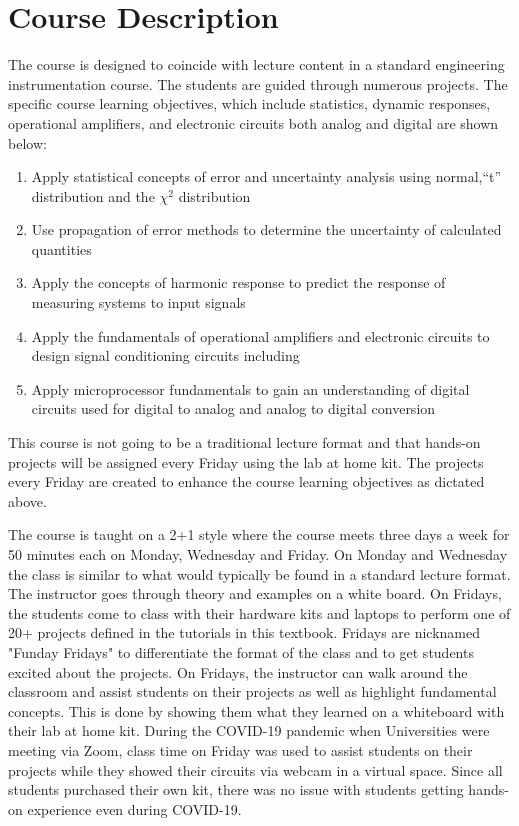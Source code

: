 \section{Course Description}

The course is designed to coincide with lecture content in a standard
engineering instrumentation course. The students are guided through
numerous projects. The specific course learning objectives, which include
statistics, dynamic responses, operational amplifiers, and electronic
circuits both analog and digital are shown below:
\begin{enumerate}[itemsep=-5pt]
\item Apply statistical concepts of error and uncertainty analysis using normal,“t” distribution and the $\chi^2$ distribution
\item Use propagation of error methods to determine the uncertainty of calculated quantities
\item Apply the concepts of harmonic response to predict the response of measuring systems to input signals
\item Apply the fundamentals of operational amplifiers and electronic circuits to design signal conditioning circuits including %
\item Apply microprocessor fundamentals to gain an understanding of digital circuits used for digital to analog and analog to digital conversion
\end{enumerate}

This course is not going to be a traditional lecture format and that
hands-on projects will be assigned every Friday using the lab at home
kit. The projects every Friday are created to enhance the course
learning objectives as dictated above.  

The course is taught on a 2+1 style where the course meets three days
a week for 50 minutes each on Monday, Wednesday and Friday. On Monday
and Wednesday the class is similar to what would typically be found in
a standard lecture format. The instructor goes through theory and examples on a
white board. On Fridays, the students come to class with their
hardware kits and laptops to perform one of 20+ projects defined in
the tutorials in this textbook. Fridays are nicknamed "Funday Fridays"
to differentiate the format of the class and to get students excited about the
projects. On Fridays, the instructor can walk around the classroom and
assist students on their projects as well as highlight fundamental
concepts. This is done by showing them what they learned on a
whiteboard with their lab at home kit. During the COVID-19 pandemic
when Universities were meeting via Zoom, class time on Friday was used
to assist students on their projects while they showed their circuits via
webcam in a virtual space. Since all students purchased their own kit,
there was no issue with students getting hands-on experience even
during COVID-19.  

